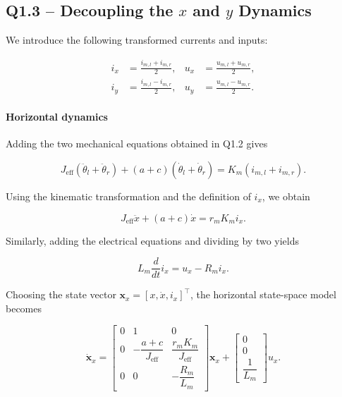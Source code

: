 \documentclass[a4paper,12pt]{article}
\begin{document}
\subsection*{Q1.3 -- Decoupling the $x$ and $y$ Dynamics}


We introduce the following transformed currents and inputs:

\begin{equation}
\begin{aligned}
i_x &= \frac{i_{m,l}+i_{m,r}}{2},
& u_x &= \frac{u_{m,l}+u_{m,r}}{2},\\
i_y &= \frac{i_{m,l}-i_{m,r}}{2},
& u_y &= \frac{u_{m,l}-u_{m,r}}{2}.
\end{aligned}
\end{equation}

\paragraph{Horizontal dynamics}

Adding the two mechanical equations obtained in Q1.2 gives

\begin{equation}
J_{\mathrm{eff}}(\ddot{\theta}_l+\ddot{\theta}_r)
+(a+c)(\dot{\theta}_l+\dot{\theta}_r)
=K_m(i_{m,l}+i_{m,r}).
\end{equation}

Using the kinematic transformation and the definition of $i_x$, we obtain

\begin{equation}
J_{\mathrm{eff}}\ddot{x}
+(a+c)\dot{x}=r_mK_mi_x.
\end{equation}

Similarly, adding the electrical equations and dividing by two yields

\begin{equation}
L_m\frac{d}{dt}{i}_x
=u_x-R_mi_x.
\end{equation}

Choosing the state vector
$\mathbf{x}_x=[x,\dot{x},i_x]^\top$, the horizontal state-space model becomes

\begin{equation}
\boxed{
\dot{\mathbf{x}}_x=
\begin{bmatrix}
0 & 1 & 0\\
0 & -\dfrac{a+c}{J_{\mathrm{eff}}}
  & \dfrac{r_mK_m}{J_{\mathrm{eff}}}\\
0 & 0 & -\dfrac{R_m}{L_m}
\end{bmatrix}
\mathbf{x}_x+
\begin{bmatrix}
0\\0\\\dfrac{1}{L_m}
\end{bmatrix}u_x.
}
\end{equation}
\end{document}
